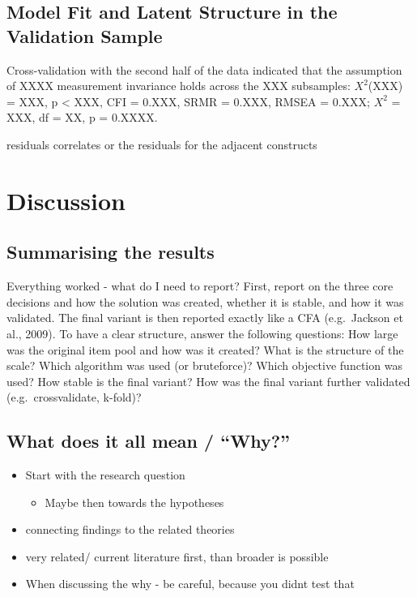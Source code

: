 \documentclass[
  12pt,
  a4paper,
  twoside]{article}
\providecommand{\tightlist}{%
  \setlength{\itemsep}{0pt}\setlength{\parskip}{0pt}}
\begin{document}
\subsection{Model Fit and Latent Structure in the Validation Sample}\label{model-fit-and-latent-structure-in-the-validation-sample}

Cross-validation with the second half of the data indicated that the assumption of XXXX measurement invariance holds across the XXX subsamples: \(X^{2}\)(XXX) = XXX, p \textless{} XXX, CFI = 0.XXX, SRMR = 0.XXX, RMSEA = 0.XXX; \(X^{2}\) = XXX, df = XX, p = 0.XXXX.

residuals
correlates or the residuals for the adjacent constructs

\section{Discussion}\label{discussion}

\subsection{Summarising the results}\label{summarising-the-results}

Everything worked - what do I need to report?
First, report on the three core decisions and how the solution was created, whether it is stable, and how it was validated. The final variant is then reported exactly like a CFA (e.g.~Jackson et al., 2009). To have a clear structure, answer the following questions:
How large was the original item pool and how was it created?
What is the structure of the scale?
Which algorithm was used (or bruteforce)?
Which objective function was used?
How stable is the final variant?
How was the final variant further validated (e.g.~crossvalidate, k-fold)?

\subsection{What does it all mean / ``Why?''}\label{what-does-it-all-mean-why}

\begin{itemize}
\tightlist
\item
  Start with the research question

  \begin{itemize}
  \tightlist
  \item
    Maybe then towards the hypotheses
  \end{itemize}
\item
  connecting findings to the related theories
\item
  very related/ current literature first, than broader is possible
\item
  When discussing the why - be careful, because you didnt test that
\end{itemize}
\end{document}
